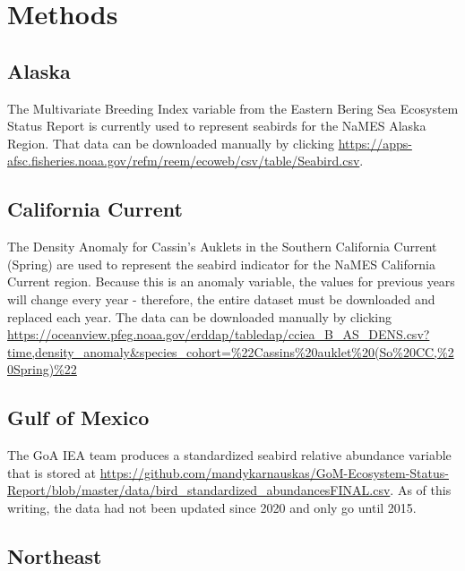 \documentclass[
]{book}
\begin{document}
\hypertarget{methods-3}{%
\section{Methods}\label{methods-3}}

\hypertarget{alaska-2}{%
\subsection{Alaska}\label{alaska-2}}

The Multivariate Breeding Index variable from the Eastern Bering Sea Ecosystem Status Report is currently used to represent seabirds for the NaMES Alaska Region. That data can be downloaded manually by clicking \url{https://apps-afsc.fisheries.noaa.gov/refm/reem/ecoweb/csv/table/Seabird.csv}.

\hypertarget{california-current-2}{%
\subsection{California Current}\label{california-current-2}}

The Density Anomaly for Cassin's Auklets in the Southern California Current (Spring) are used to represent the seabird indicator for the NaMES California Current region. Because this is an anomaly variable, the values for previous years will change every year - therefore, the entire dataset must be downloaded and replaced each year. The data can be downloaded manually by clicking \url{https://oceanview.pfeg.noaa.gov/erddap/tabledap/cciea_B_AS_DENS.csv?time,density_anomaly\&species_cohort=\%22Cassins\%20auklet\%20(So\%20CC,\%20Spring)\%22}

\hypertarget{gulf-of-mexico-2}{%
\subsection{Gulf of Mexico}\label{gulf-of-mexico-2}}

The GoA IEA team produces a standardized seabird relative abundance variable that is stored at \url{https://github.com/mandykarnauskas/GoM-Ecosystem-Status-Report/blob/master/data/bird_standardized_abundancesFINAL.csv}. As of this writing, the data had not been updated since 2020 and only go until 2015.

\hypertarget{northeast-2}{%
\subsection{Northeast}\label{northeast-2}}
\end{document}
